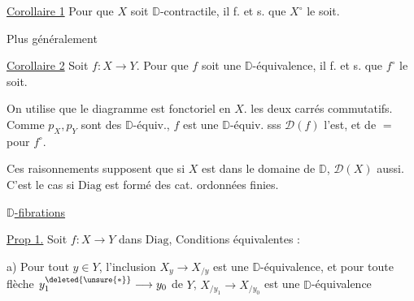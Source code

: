 
 

\uline{Corollaire 1} Pour que $X$ soit $\mathbb D$-contractile, il f. et s. que $X^\circ$ le soit.

Plus généralement

\uline{Corollaire 2} Soit $f:X\longrightarrow Y$. Pour que $f$ soit une $\mathbb D$-équivalence, il f. et s. que $f^\circ$ le soit.

On utilise que le diagramme
est fonctoriel en $X$. 
les deux carrés commutatifs. Comme $p_X,p_Y$ sont des $\mathbb D$-équiv., $f$ est une $\mathbb D$-équiv. sss $\mathscr D(f)$ l'est, et de $=$ pour $f^\circ$.

Ces raisonnements supposent que si $X$ est dans le domaine de $\mathbb D$, $\mathscr D(X)$ aussi. C'est le cas si $\mathrm{Diag}$ est formé des cat. ordonnées finies.


\uline{$\mathbb D$-fibrations}

\uline{Prop 1.} Soit $f:X\longrightarrow Y$ dans $\mathrm{Diag}$, Conditions équivalentes :

a) Pour  tout $y\in Y$, l'inclusion $X_y\longrightarrow X_{/y}$ est une $\mathbb D$-équivalence, et pour toute flèche $y_1^{\deleted{\unsure{*}}}\longrightarrow y_0$ de $Y$, $X_{/y_1}\longrightarrow X_{/y_0}$ est une $\mathbb D$-équivalence

